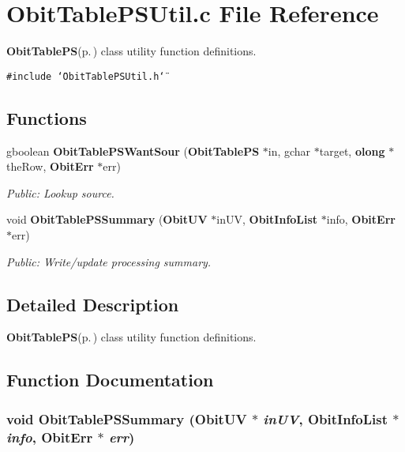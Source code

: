 \section{Obit\-Table\-PSUtil.c File Reference}
\label{ObitTablePSUtil_8c}
{\bf Obit\-Table\-PS}{\rm (p.\,\pageref{structObitTablePS})} class utility function definitions. 

{\tt \#include \char`\"{}Obit\-Table\-PSUtil.h\char`\"{}}\par
\subsection*{Functions}
\begin{CompactItemize}
\item 
gboolean {\bf Obit\-Table\-PSWant\-Sour} ({\bf Obit\-Table\-PS} $\ast$in, gchar $\ast$target, {\bf olong} $\ast$the\-Row, {\bf Obit\-Err} $\ast$err)
\begin{CompactList}\small\item\em Public: Lookup source. \item\end{CompactList}\item 
void {\bf Obit\-Table\-PSSummary} ({\bf Obit\-UV} $\ast$in\-UV, {\bf Obit\-Info\-List} $\ast$info, {\bf Obit\-Err} $\ast$err)
\begin{CompactList}\small\item\em Public: Write/update processing summary. \item\end{CompactList}\end{CompactItemize}


\subsection{Detailed Description}
{\bf Obit\-Table\-PS}{\rm (p.\,\pageref{structObitTablePS})} class utility function definitions. 



\subsection{Function Documentation}
\subsubsection{\setlength{\rightskip}{0pt plus 5cm}void Obit\-Table\-PSSummary ({\bf Obit\-UV} $\ast$ {\em in\-UV}, {\bf Obit\-Info\-List} $\ast$ {\em info}, {\bf Obit\-Err} $\ast$ {\em err})}\label{ObitTablePSUtil_8c_a1}


